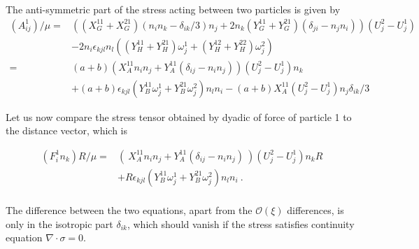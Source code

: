 \documentclass[reprint, amsmath,amssymb,aps,pre,onecolumn,notitlepage%
]{revtex4-1}
\begin{document}
The anti-symmetric part of the stress acting between two particles is given by
\begin{equation}
	\begin{split}
			(A^1_{ij})/\mu=& \left((X_G^{11}+X_G^{21})(n_in_k-\delta_{ik}/3)n_j+2 n_k (Y_G^{11}+Y_G^{21})(\delta_{ji}-n_jn_i) \right)(U_j^2-U_j^1)\\
		&- 2 n_i \epsilon_{kjl} n_l ((Y_H^{11}+Y_H^{21})\omega_j^1+(Y_H^{12}+Y_H^{22})\omega_j^2)\\ 
			=& (a+b)\left(X_A^{11}n_in_j+ Y_A^{11} (\delta_{ij}-n_in_j) \right) (U_j^2-U_j^1)n_k \\
		       &+ (a+b) \epsilon_{kjl} (Y_B^{11} \omega_j^1 +Y_B^{21} \omega_j^2)n_l n_i -(a+b)X_A^{11}(U_j^2-U_j^1) n_j \delta_{ik}/3
	\end{split}
	\label{eq:simple_let2}
\end{equation}



Let us now compare the stress tensor obtained by dyadic of force of particle 1 to the distance vector, which is

\begin{equation}
\begin{split}
	(F^1_i n_k)R/\mu=& (\ X_A^{11}n_in_j+Y_A^{11}(\delta_{ij}-n_in_j)\ )(U^2_j-U^1_j) n_k R\\
	&+ R \epsilon_{kjl} \left(Y_B^{11}\omega_j^1+Y_B^{21}\omega_j^2\right) n_l n_i \ .\\
\end{split}
\end{equation}

The difference between the two equations, apart from the $\mathcal{O}(\xi)$ differences, is only in the isotropic part $\delta_{ik}$, which should vanish if the stress satisfies continuity equation $\nabla\cdot\sigma=0$.



\end{document}

